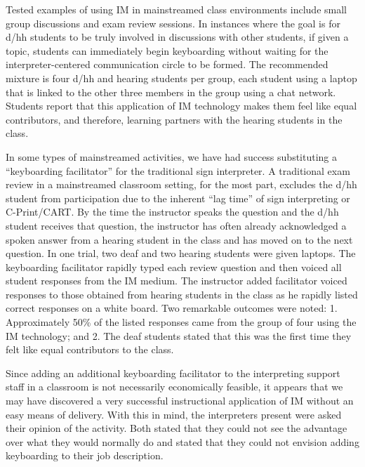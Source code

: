 \documentclass[11.5pt]{sig-alternate} %
\begin{document}
\begin{large}
Tested examples of using IM in mainstreamed class environments include small group discussions and exam review sessions. In instances where the goal is for d/hh students to be truly involved in discussions with other students, if given a topic, students can immediately begin keyboarding without waiting for the interpreter-centered communication circle to be formed. The recommended mixture is four d/hh and hearing students per group, each student using a laptop that is linked to the other three members in the group using a chat network. Students report that this application of IM technology makes them feel like equal contributors, and therefore, learning partners with the hearing students in the class. 

In some types of mainstreamed activities, we have had success substituting a ``keyboarding facilitator'' for the traditional sign interpreter. A traditional exam review in a mainstreamed classroom setting, for the most part, excludes the d/hh student from participation due to the inherent “lag time” of sign interpreting or C-Print/CART. By the time the instructor speaks the question and the d/hh student receives that question, the instructor has often already acknowledged a spoken answer from a hearing student in the class and has moved on to the next question. In one trial, two deaf and two hearing students were given laptops. The keyboarding facilitator rapidly typed each review question and then voiced all student responses from the IM medium. The instructor added facilitator voiced responses to those obtained from hearing students in the class as he rapidly listed correct responses on a white board. Two remarkable outcomes were noted: 1. Approximately 50\% of the listed responses came from the group of four using the IM technology; and 2. The deaf students stated that this was the first time they felt like equal contributors to the class. 

Since adding an additional keyboarding facilitator to the interpreting support staff in a classroom is not necessarily economically feasible, it appears that we may have discovered a very successful instructional application of IM without an easy means of delivery. With this in mind, the interpreters present were asked their opinion of the activity. Both stated that they could not see the advantage over what they would normally do and stated that they could not envision adding keyboarding to their job description. 


\end{large}
\end{document}
